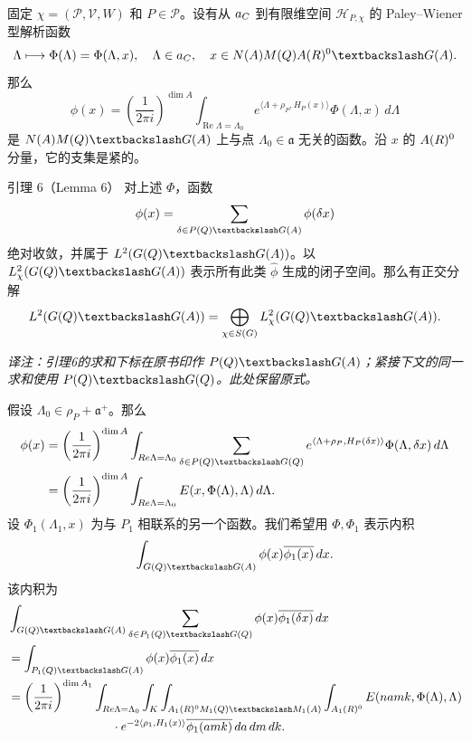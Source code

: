 固定 $\chi=(\mathcal P,\mathcal V,W)$ 和 $P\in\mathcal P$。设有从 $a_C$ 到有限维空间 $\mathcal H_{P,\chi}$ 的 Paley--Wiener 型解析函数
\[
 \Lambda\longmapsto\Phi(\Lambda)=\Phi(\Lambda,x),
 \quad\Lambda\in\mathfrak a_\C,\quad x\in N(A)M(\Q)A(\R)^0\backslash G(A).
\]
那么
\[
 \phi(x)=\left(\frac1{2\pi i}\right)^{\dim A}
 \int_{\operatorname{Re}\Lambda=\Lambda_0}
 e^{\langle\Lambda+\rho_P,H_P(x)\rangle}\Phi(\Lambda,x)\,d\Lambda
\]
是 $N(A)M(\Q)\backslash G(A)$ 上与点 $\Lambda_0\in\mathfrak a$ 无关的函数。沿 $x$ 的 $A(R)^0$ 分量，它的支集是紧的。

\begin{originaltheorem}{引理 6（Lemma 6）}
对上述 $\Phi$，函数
\[
 \widehat\phi(x)=\sum_{\delta\in P(\Q)\backslash G(A)}\phi(\delta x)
\]
绝对收敛，并属于 $L^2(G(\Q)\backslash G(A))$。以 $L_\chi^2(G(\Q)\backslash G(A))$ 表示所有此类 $\widehat\phi$ 生成的闭子空间。那么有正交分解
\[
 L^2(G(\Q)\backslash G(A))=\bigoplus_{\chi\in\mathcal S(G)}L_\chi^2(G(\Q)\backslash G(A)).
\]
\end{originaltheorem}
\noindent\textit{译注：引理6的求和下标在原书印作 $P(\Q)\backslash G(A)$；紧接下文的同一求和使用 $P(\Q)\backslash G(\Q)$。此处保留原式。}

假设 $\Lambda_0\in\rho_P+\mathfrak a^+$。那么
\[
\begin{split}
 \widehat\phi(x)
 &=\left(\frac1{2\pi i}\right)^{\dim A}
 \int_{\operatorname{Re}\Lambda=\Lambda_0}
 \sum_{\delta\in P(\Q)\backslash G(\Q)}
 e^{\langle\Lambda+\rho_P,H_P(\delta x)\rangle}\Phi(\Lambda,\delta x)\,d\Lambda\\
 &=\left(\frac1{2\pi i}\right)^{\dim A}
 \int_{\operatorname{Re}\Lambda=\Lambda_0}E(x,\Phi(\Lambda),\Lambda)\,d\Lambda.
\end{split}
\]
设 $\Phi_1(\Lambda_1,x)$ 为与 $P_1$ 相联系的另一个函数。我们希望用 $\Phi,\Phi_1$ 表示内积
\[
 \int_{G(\Q)\backslash G(A)}\widehat\phi(x)\overline{\widehat\phi_1(x)}\,dx.
\]
该内积为
\[
\begin{split}
 &\int_{G(\Q)\backslash G(A)}\sum_{\delta\in P_1(\Q)\backslash G(\Q)}
 \widehat\phi(x)\overline{\phi_1(\delta x)}\,dx\\
 &=\int_{P_1(\Q)\backslash G(A)}\widehat\phi(x)\overline{\phi_1(x)}\,dx\\
 &=\left(\frac1{2\pi i}\right)^{\dim A_1}
 \int_{\operatorname{Re}\Lambda=\Lambda_0}\int_K
 \int_{A_1(\R)^0M_1(\Q)\backslash M_1(A)}\int_{A_1(\R)^0}
 E(namk,\Phi(\Lambda),\Lambda)\\
 &\hspace{30mm}\cdot e^{-2\langle\rho_1,H_1(x)\rangle}
 \overline{\phi_1(amk)}\,da\,dm\,dk.
\end{split}
\]

